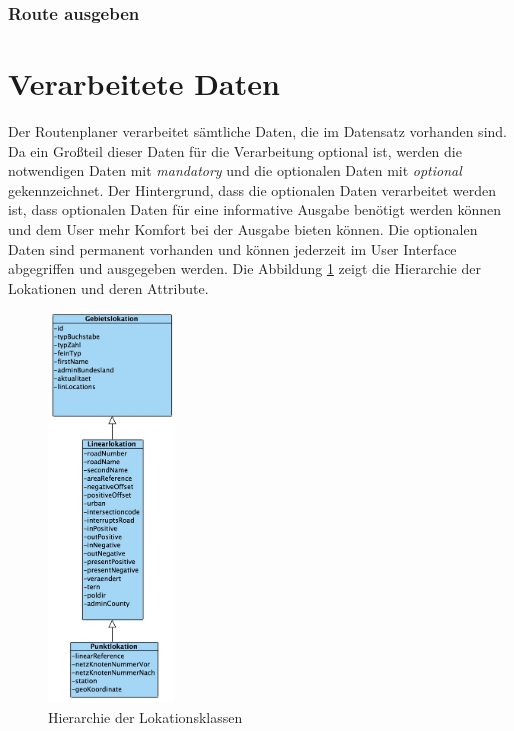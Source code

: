 \documentclass[12pt, a4paper, ngerman]{article}
\begin{document}
\subsubsection{Route ausgeben \label{uc:RouteAusgeben}}
\begin{usecase}
\end{usecase}

\section{Verarbeitete Daten}
Der Routenplaner verarbeitet sämtliche Daten, die im Datensatz vorhanden sind. Da ein Großteil dieser Daten für die Verarbeitung optional ist, werden die notwendigen Daten mit \textit{mandatory} und die optionalen Daten mit \textit{optional} gekennzeichnet. Der Hintergrund, dass die optionalen Daten verarbeitet werden ist, dass optionalen Daten für eine informative Ausgabe benötigt werden können und dem User mehr Komfort bei der Ausgabe bieten können. Die optionalen Daten sind permanent vorhanden und können jederzeit im User Interface abgegriffen und ausgegeben werden.
Die Abbildung \ref{fig:klassendiagrammLokations} zeigt die Hierarchie der Lokationen und deren Attribute.

\begin{figure}[htbp] 
  \centering
     \includegraphics[width=0.3\textwidth]{Grafiken/klassenDiagrammLokations.jpg}
  \caption{Hierarchie der Lokationsklassen}
  \label{fig:klassendiagrammLokations}
\end{figure}
\end{document}
